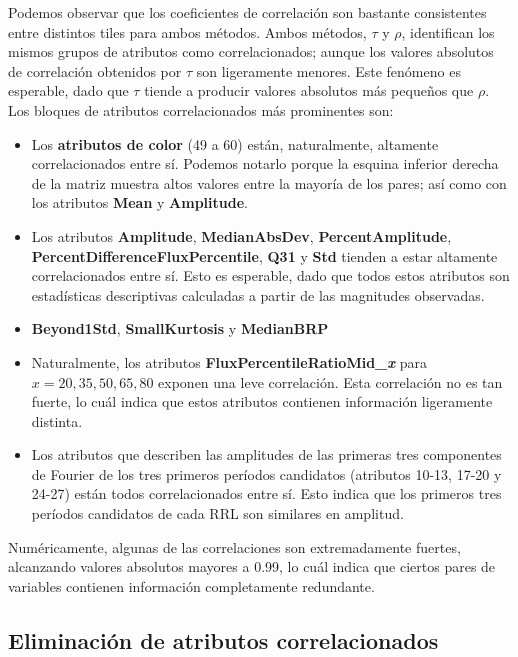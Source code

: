 Podemos observar que los coeficientes de correlación son bastante consistentes entre distintos tiles para ambos métodos. Ambos métodos, $\tau$ y $\rho$, identifican los mismos grupos de atributos como correlacionados; aunque los valores absolutos de correlación obtenidos por $\tau$ son ligeramente menores. Este fenómeno es esperable, dado que $\tau$ tiende a producir valores absolutos más pequeños que $\rho$. \\

Los bloques de atributos correlacionados más prominentes son:

\begin{itemize}
\item Los \textbf{atributos de color} (49 a 60) están, naturalmente, altamente correlacionados entre sí. Podemos notarlo porque la esquina inferior derecha de la matriz muestra altos valores entre la mayoría de los pares; así como con los atributos \textbf{Mean} y \textbf{Amplitude}.
\item Los atributos \textbf{Amplitude}, \textbf{MedianAbsDev}, \textbf{PercentAmplitude}, \textbf{PercentDifferenceFluxPercentile}, \textbf{Q31} y \textbf{Std} tienden a estar altamente correlacionados entre sí. Esto es esperable, dado que todos estos atributos son estadísticas descriptivas calculadas a partir de las magnitudes observadas.
\item \textbf{Beyond1Std}, \textbf{SmallKurtosis} y \textbf{MedianBRP}
\item Naturalmente, los atributos \textbf{FluxPercentileRatioMid\_\textit{x}} para $x=20, 35, 50, 65, 80$ exponen una leve correlación. Esta correlación no es tan fuerte, lo cuál indica que estos atributos contienen información ligeramente distinta.
\item Los atributos que describen las amplitudes de las primeras tres componentes de Fourier de los tres primeros períodos candidatos (atributos 10-13, 17-20 y 24-27) están todos correlacionados entre sí. Esto indica que los primeros tres períodos candidatos de cada RRL son similares en amplitud.
\end{itemize}

Numéricamente, algunas de las correlaciones son extremadamente fuertes, alcanzando valores absolutos mayores a 0.99, lo cuál indica que ciertos pares de variables contienen información completamente redundante.

\subsection{ Eliminación de atributos correlacionados }

